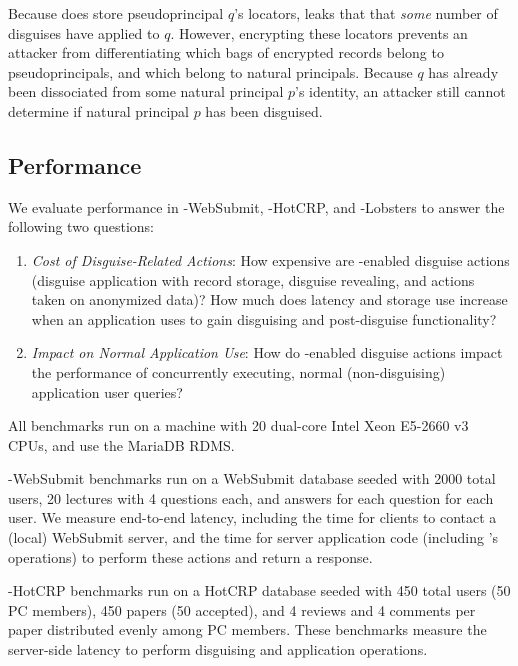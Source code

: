 Because \sys does store pseudoprincipal $q$'s locators, \sys leaks that that \emph{some} number of
disguises have applied to $q$.  However, encrypting these locators prevents an attacker from
differentiating which bags of encrypted records belong to pseudoprincipals, and which belong to
natural principals.  Because $q$ has already been dissociated from some natural principal $p$'s
identity, an attacker still cannot determine if natural principal $p$ has been disguised.


\subsection{Performance}

We evaluate performance in \sys-WebSubmit, \sys-HotCRP, and \sys-Lobsters to answer the
following two questions:
\begin{enumerate}
\item \emph{Cost of Disguise-Related Actions}: How expensive are \sys-enabled disguise actions
(disguise application with record storage, disguise revealing, and actions taken on anonymized data)?
How much does latency and storage use increase when an application uses \sys to gain disguising and post-disguise functionality?
\item \emph{Impact on Normal Application Use}: How do \sys-enabled disguise actions impact the
    performance of concurrently executing, normal (non-disguising) application user queries?
\end{enumerate}

All benchmarks run on a machine with 20 dual-core Intel Xeon E5-2660 v3 CPUs, and use the MariaDB
RDMS.

\sys-WebSubmit benchmarks run on a WebSubmit database seeded with 2000 total users, 20
lectures with 4 questions each, and answers for each question for each user.  We measure end-to-end
latency, including the time for clients to contact a (local) WebSubmit server, and the time for
server application code (including \sys's operations) to perform these actions and return a
response.

\sys-HotCRP benchmarks run on a HotCRP database seeded with 450 total users (50 PC members),
450 papers (50 accepted), and 4 reviews and 4 comments per paper distributed evenly among PC
members. These benchmarks measure the server-side latency to perform disguising and application
operations.

